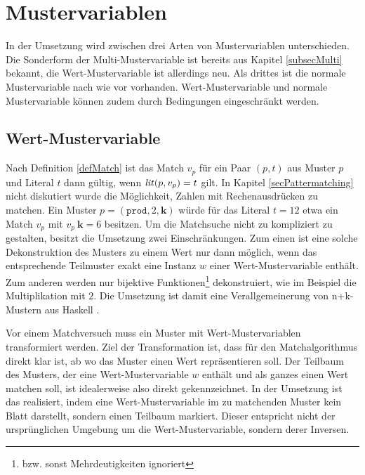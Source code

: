 \section{Mustervariablen} \label{subsecMustervariablen}
In der Umsetzung wird zwischen drei Arten von Mustervariablen unterschieden. Die Sonderform der Multi-Mustervariable ist bereits aus Kapitel \ref{subsecMulti} bekannt, die Wert-Mustervariable ist allerdings neu. Als drittes ist die normale Mustervariable nach wie vor vorhanden. Wert-Mustervariable und normale Mustervariable können zudem durch Bedingungen eingeschränkt werden.

\subsection{Wert-Mustervariable} \label{subsubsecWertMustervariable}
Nach Definition \ref{defMatch} ist das Match $v_p$ für ein Paar $(p, t)$ aus Muster $p$ und Literal $t$ dann gültig, wenn $\mathit{lit}(p, v_p) = t$ gilt. In Kapitel \ref{secPattermatching} nicht diskutiert wurde die Möglichkeit, Zahlen mit Rechenausdrücken zu matchen. Ein Muster $p = (\texttt{prod}, 2, \mathbf k)$ würde für das Literal $t = 12$ etwa ein Match $v_p$ mit $v_p~\mathbf k = 6$ besitzen. Um die Matchsuche nicht zu kompliziert zu gestalten, besitzt die Umsetzung zwei Einschränkungen. Zum einen ist eine solche Dekonstruktion des Musters zu einem Wert nur dann möglich, wenn das entsprechende Teilmuster exakt eine Instanz $w$ einer Wert-Mustervariable enthält. Zum anderen werden nur bijektive Funktionen\footnote{bzw. sonst Mehrdeutigkeiten ignoriert} dekonstruiert, wie im Beispiel die Multiplikation mit $2$. Die Umsetzung ist damit eine Verallgemeinerung von n+k-Mustern aus Haskell \cite{nPlusK}.


Vor einem Matchversuch muss ein Muster mit Wert-Mustervariablen transformiert werden. Ziel der Transformation ist, dass für den Matchalgorithmus direkt klar ist, ab wo das Muster einen Wert repräsentieren soll. Der Teilbaum des Musters, der eine Wert-Mustervariable $w$ enthält und als ganzes einen Wert matchen soll, ist idealerweise also direkt gekennzeichnet. In der Umsetzung ist das realisiert, indem eine Wert-Mustervariable im zu matchenden Muster kein Blatt darstellt, sondern einen Teilbaum markiert. Dieser entspricht nicht der ursprünglichen Umgebung um die Wert-Mustervariable, sondern derer Inversen. 

